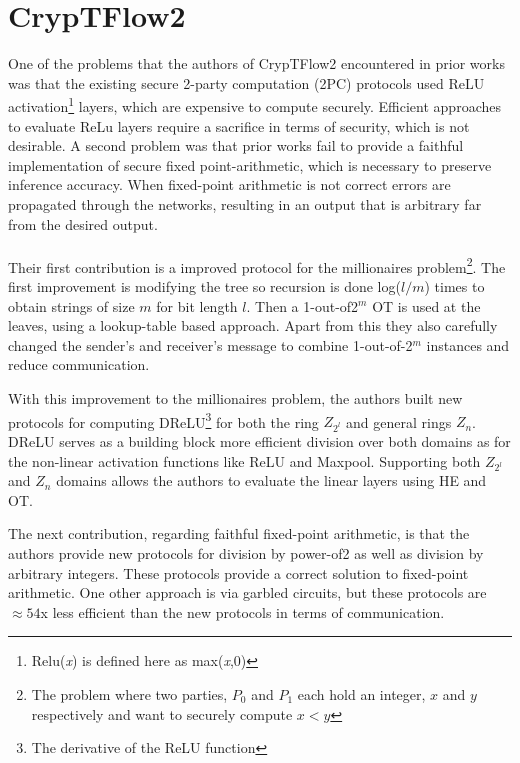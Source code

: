 \documentclass[../thesis.tex]{subfiles}
\begin{document}
\section{CrypTFlow2}
One of the problems that the authors of CrypTFlow2 encountered in prior works was that the existing secure 2-party computation (2PC) protocols used ReLU activation\footnote{Relu(\textit{x}) is defined here as max(\textit{x},0)} layers, which are expensive to compute securely. Efficient approaches to evaluate ReLu layers require a sacrifice in terms of security, which is not desirable. A second problem was that prior works fail to provide a faithful implementation of secure fixed point-arithmetic, which is necessary to preserve inference accuracy. When fixed-point arithmetic is not correct errors are propagated through the networks, resulting in an output that is arbitrary far from  the desired output. \paragraph{}

Their first contribution is a improved protocol for the millionaires problem\footnote{The problem where two parties, $P_0$ and $P_1$ each hold an integer, $x$ and $y$ respectively and want to securely compute $x<y$}. The first improvement is modifying the tree so recursion is done log($l/m$) times to obtain strings of size $m$ for bit length $l$. Then a 1-out-of2$^m$ OT is used at the leaves, using a lookup-table based approach. Apart from this they also carefully changed the sender's and receiver's message to combine 1-out-of-2$^m$ instances and reduce communication.  

With this improvement to the millionaires problem, the authors built new protocols for computing DReLU\footnote{The derivative of the ReLU function} for both the ring $Z_{2^l}$ and general rings $Z_n$. DReLU serves as a building block more efficient division over both domains as for the non-linear activation functions like ReLU and Maxpool. Supporting both $Z_{2^l}$ and $Z_n$ domains allows the authors to evaluate the linear layers using HE and OT. 

The next contribution, regarding faithful fixed-point arithmetic, is that the authors provide new protocols for division by power-of2 as well as division by arbitrary integers. These protocols provide a correct solution to fixed-point arithmetic. One other approach is via garbled circuits, but these protocols are $\approx 54$x less efficient than the new protocols in terms of communication. 
\end{document}
